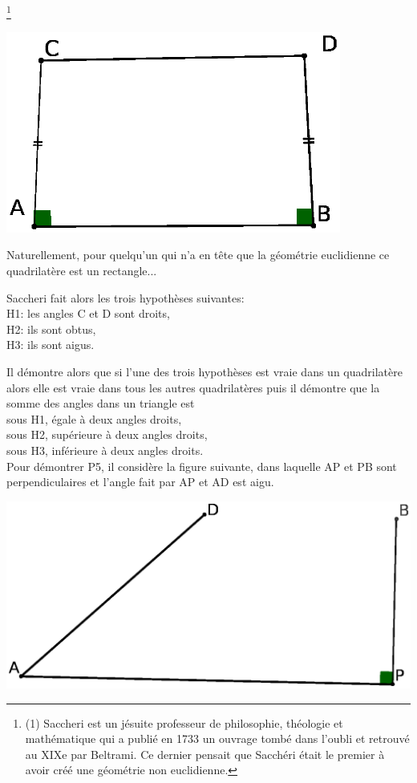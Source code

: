 \documentclass[a4paper, 12pt, twoside]{book}
\begin{document}
  
 \footnote{(1) Saccheri est un jésuite professeur de philosophie, théologie et mathématique qui a publié en 1733 un ouvrage tombé dans l'oubli et retrouvé au XIXe par Beltrami. Ce dernier pensait que Sacchéri était le premier à avoir créé une géométrie non euclidienne.}
 
  
 
 \includegraphics[width=11cm]{figures/sac.eps}  \bigskip 
 
  Naturellement, pour quelqu'un qui n'a en tête que la géométrie euclidienne ce quadrilatère est un rectangle... 
 


 
   

 
 Saccheri fait alors les trois hypothèses suivantes: \\
H1: les angles C et D sont droits,\\
H2: ils sont obtus,\\
H3: ils sont aigus.\bigskip



  
     Il démontre alors que si l'une des trois hypothèses est vraie dans un quadrilatère alors elle est vraie dans tous les autres quadrilatères puis il démontre que la somme des angles dans un triangle est
       \\
       sous H1, égale à deux angles droits,\\
      sous H2, supérieure à deux angles droits,\\
      sous H3, inférieure à deux angles droits.\\ 
      
 Pour démontrer P5, il considère la figure suivante, dans laquelle AP et PB sont perpendiculaires et l'angle fait par AP et AD est aigu.
  

\includegraphics[scale=0.5]{figures/sacc2002.eps} 
   
\end{document}
